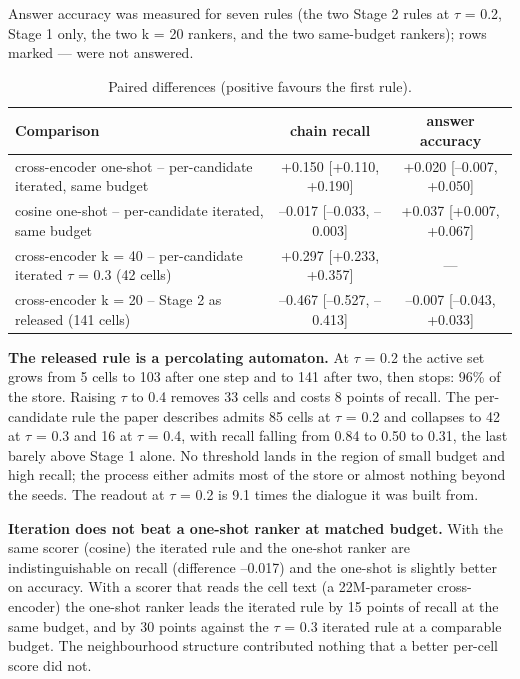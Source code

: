 \documentclass[11pt]{article}
\begin{document}
Answer accuracy was measured for seven rules (the two Stage 2 rules at $\tau$ = 0.2, Stage 1 only, the two k = 20 rankers, and the two same-budget rankers); rows marked --- were not answered.

\begin{table}[t]
\centering\small
\setlength{\tabcolsep}{4pt}
\begin{tabular}{lcc}
\toprule
Comparison & chain recall & answer accuracy \\
\midrule
cross-encoder one-shot -- per-candidate iterated, same budget & +0.150 [+0.110, +0.190] & +0.020 [--0.007, +0.050] \\
cosine one-shot -- per-candidate iterated, same budget & --0.017 [--0.033, --0.003] & +0.037 [+0.007, +0.067] \\
cross-encoder k = 40 -- per-candidate iterated $\tau$ = 0.3 (42 cells) & +0.297 [+0.233, +0.357] & --- \\
cross-encoder k = 20 -- Stage 2 as released (141 cells) & --0.467 [--0.527, --0.413] & --0.007 [--0.043, +0.033] \\
\bottomrule
\end{tabular}
\caption{Paired differences (positive favours the first rule).}
\end{table}

\textbf{The released rule is a percolating automaton.} At $\tau$ = 0.2 the active set grows from 5 cells to 103 after one step and to 141 after two, then stops: 96\% of the store. Raising $\tau$ to 0.4 removes 33 cells and costs 8 points of recall. The per-candidate rule the paper describes admits 85 cells at $\tau$ = 0.2 and collapses to 42 at $\tau$ = 0.3 and 16 at $\tau$ = 0.4, with recall falling from 0.84 to 0.50 to 0.31, the last barely above Stage 1 alone. No threshold lands in the region of small budget and high recall; the process either admits most of the store or almost nothing beyond the seeds. The readout at $\tau$ = 0.2 is 9.1 times the dialogue it was built from.

\textbf{Iteration does not beat a one-shot ranker at matched budget.} With the same scorer (cosine) the iterated rule and the one-shot ranker are indistinguishable on recall (difference --0.017) and the one-shot is slightly better on accuracy. With a scorer that reads the cell text (a 22M-parameter cross-encoder) the one-shot ranker leads the iterated rule by 15 points of recall at the same budget, and by 30 points against the $\tau$ = 0.3 iterated rule at a comparable budget. The neighbourhood structure contributed nothing that a better per-cell score did not.
\end{document}
